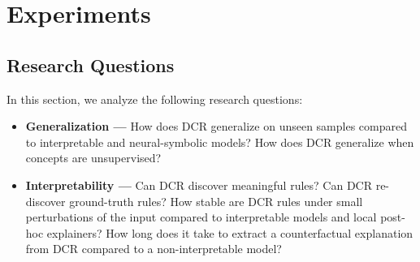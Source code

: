 




\section{Experiments}
\label{sec:exp}

\subsection{Research Questions}
In this section, we analyze the following research questions:
\begin{itemize}
    \item \textbf{Generalization ---} How does DCR generalize on unseen samples compared to interpretable and neural-symbolic models? How does DCR generalize when concepts are unsupervised?
    \item \textbf{Interpretability ---} Can DCR discover meaningful rules? Can DCR re-discover ground-truth rules? How stable are DCR rules under small perturbations of the input compared to interpretable models and local post-hoc explainers?
    How long does it take to extract a counterfactual explanation from DCR compared to a non-interpretable model?
\end{itemize}


